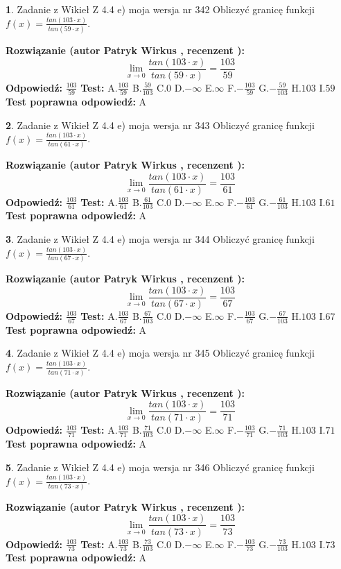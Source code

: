 \documentclass[12pt, a4paper]{article}
\theoremstyle{definition} %
\newtheorem{zad}{}
\newcommand{\zadStart}[1]{\begin{zad}#1\newline}
\newcommand{\zadStop}{\end{zad}}
\newcommand{\rozwStart}[2]{\noindent \textbf{Rozwiązanie (autor #1 , recenzent #2): }\newline}
\newcommand{\rozwStop}{\newline}
\newcommand{\odpStart}{\noindent \textbf{Odpowiedź:}\newline}
\newcommand{\odpStop}{\newline}
\newcommand{\testStart}{\noindent \textbf{Test:}\newline}
\newcommand{\testStop}{\newline}
\newcommand{\kluczStart}{\noindent \textbf{Test poprawna odpowiedź:}\newline}
\newcommand{\kluczStop}{\newline}
\begin{document}
\zadStart{Zadanie z Wikieł Z 4.4 e) moja wersja nr 342}
Obliczyć granicę funkcji $f(x)=\frac{tan(103\cdot x)}{tan(59\cdot x)}$.
\zadStop
\rozwStart{Patryk Wirkus}{}
$$\lim\limits_{x\to 0}\frac{tan(103\cdot x)}{tan(59\cdot x)}=
\frac{103}{59}$$
\rozwStop
\odpStart
$\frac{103}{59}$
\odpStop
\testStart
A.$\frac{103}{59}$
B.$\frac{59}{103}$
C.$0$
D.$-\infty$
E.$\infty$
F.$-\frac{103}{59}$
G.$-\frac{59}{103}$
H.$103$
I.$59$
\testStop
\kluczStart
A
\kluczStop



\zadStart{Zadanie z Wikieł Z 4.4 e) moja wersja nr 343}
Obliczyć granicę funkcji $f(x)=\frac{tan(103\cdot x)}{tan(61\cdot x)}$.
\zadStop
\rozwStart{Patryk Wirkus}{}
$$\lim\limits_{x\to 0}\frac{tan(103\cdot x)}{tan(61\cdot x)}=
\frac{103}{61}$$
\rozwStop
\odpStart
$\frac{103}{61}$
\odpStop
\testStart
A.$\frac{103}{61}$
B.$\frac{61}{103}$
C.$0$
D.$-\infty$
E.$\infty$
F.$-\frac{103}{61}$
G.$-\frac{61}{103}$
H.$103$
I.$61$
\testStop
\kluczStart
A
\kluczStop



\zadStart{Zadanie z Wikieł Z 4.4 e) moja wersja nr 344}
Obliczyć granicę funkcji $f(x)=\frac{tan(103\cdot x)}{tan(67\cdot x)}$.
\zadStop
\rozwStart{Patryk Wirkus}{}
$$\lim\limits_{x\to 0}\frac{tan(103\cdot x)}{tan(67\cdot x)}=
\frac{103}{67}$$
\rozwStop
\odpStart
$\frac{103}{67}$
\odpStop
\testStart
A.$\frac{103}{67}$
B.$\frac{67}{103}$
C.$0$
D.$-\infty$
E.$\infty$
F.$-\frac{103}{67}$
G.$-\frac{67}{103}$
H.$103$
I.$67$
\testStop
\kluczStart
A
\kluczStop



\zadStart{Zadanie z Wikieł Z 4.4 e) moja wersja nr 345}
Obliczyć granicę funkcji $f(x)=\frac{tan(103\cdot x)}{tan(71\cdot x)}$.
\zadStop
\rozwStart{Patryk Wirkus}{}
$$\lim\limits_{x\to 0}\frac{tan(103\cdot x)}{tan(71\cdot x)}=
\frac{103}{71}$$
\rozwStop
\odpStart
$\frac{103}{71}$
\odpStop
\testStart
A.$\frac{103}{71}$
B.$\frac{71}{103}$
C.$0$
D.$-\infty$
E.$\infty$
F.$-\frac{103}{71}$
G.$-\frac{71}{103}$
H.$103$
I.$71$
\testStop
\kluczStart
A
\kluczStop



\zadStart{Zadanie z Wikieł Z 4.4 e) moja wersja nr 346}
Obliczyć granicę funkcji $f(x)=\frac{tan(103\cdot x)}{tan(73\cdot x)}$.
\zadStop
\rozwStart{Patryk Wirkus}{}
$$\lim\limits_{x\to 0}\frac{tan(103\cdot x)}{tan(73\cdot x)}=
\frac{103}{73}$$
\rozwStop
\odpStart
$\frac{103}{73}$
\odpStop
\testStart
A.$\frac{103}{73}$
B.$\frac{73}{103}$
C.$0$
D.$-\infty$
E.$\infty$
F.$-\frac{103}{73}$
G.$-\frac{73}{103}$
H.$103$
I.$73$
\testStop
\kluczStart
A
\kluczStop
\end{document}
